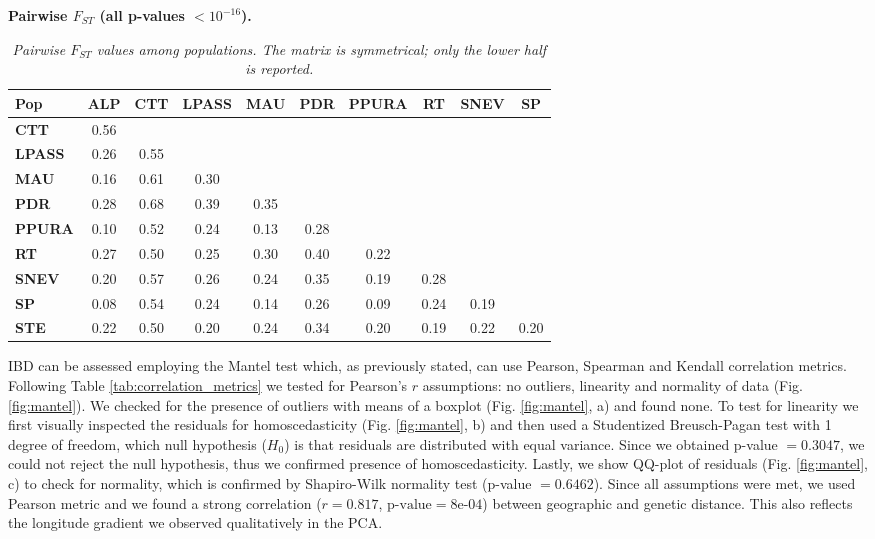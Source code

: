 \documentclass[a4paper, 12pt]{report}
\begin{document}
\begin{table}[h!]
	\centering
	\caption{\textbf{Pairwise $F_{ST}$ (all p-values $< 10^{-16}$).}}
	\label{tab:fst}
	\begin{tabular}{lccccccccc}
		\toprule
		\textbf{Pop} & \textbf{ALP} & \textbf{CTT} & \textbf{LPASS} & \textbf{MAU} & \textbf{PDR} & \textbf{PPURA} & \textbf{RT} & \textbf{SNEV} & \textbf{SP} \\
		\midrule
		\textbf{CTT}   & 0.56 &       &       &       &       &       &       &       &       \\
		\textbf{LPASS} & 0.26 & 0.55  &       &       &       &       &       &       &       \\
		\textbf{MAU}   & 0.16 & 0.61  & 0.30  &       &       &       &       &       &       \\
		\textbf{PDR}   & 0.28 & 0.68  & 0.39  & 0.35  &       &       &       &       &       \\
		\textbf{PPURA} & 0.10 & 0.52  & 0.24  & 0.13  & 0.28  &       &       &       &       \\
		\textbf{RT}    & 0.27 & 0.50  & 0.25  & 0.30  & 0.40  & 0.22  &       &       &       \\
		\textbf{SNEV}  & 0.20 & 0.57  & 0.26  & 0.24  & 0.35  & 0.19  & 0.28  &       &       \\
		\textbf{SP}    & 0.08 & 0.54  & 0.24  & 0.14  & 0.26  & 0.09  & 0.24  & 0.19  &       \\
		\textbf{STE}   & 0.22 & 0.50  & 0.20  & 0.24  & 0.34  & 0.20  & 0.19  & 0.22  & 0.20  \\
		\bottomrule
	\end{tabular}
	\caption*{\footnotesize{\textit{Pairwise $F_{ST}$ values among populations. 
				The matrix is symmetrical; only the lower half is reported.}}}
\end{table}

IBD can be assessed employing the Mantel test which, as previously stated, can use Pearson, Spearman and Kendall correlation metrics. Following Table \ref{tab:correlation_metrics} we tested for Pearson's $r$ assumptions: no outliers, linearity and normality of data (Fig. \ref{fig:mantel}). We checked for the presence of outliers with means of a boxplot (Fig. \ref{fig:mantel}, a) and found none. To test for linearity we first visually inspected the residuals for homoscedasticity (Fig. \ref{fig:mantel}, b) and then used a Studentized Breusch-Pagan test with 1 degree of freedom, which null hypothesis ($H_0$) is that residuals are distributed with equal variance. Since we obtained p-value $= 0.3047$, we could not reject the null hypothesis, thus we confirmed presence of homoscedasticity. Lastly, we show QQ-plot of residuals (Fig. \ref{fig:mantel}, c) to check for normality, which is confirmed by Shapiro-Wilk normality test (p-value $= 0.6462$). Since all assumptions were met, we used Pearson metric and we found a strong correlation ($r = 0.817$, $\text{p-value} = 8\text{e-}04 $) between geographic and genetic distance. This also reflects the longitude gradient we observed qualitatively in the PCA.
\end{document}
